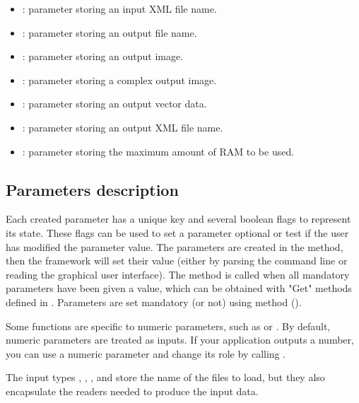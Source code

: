\begin{itemize}
  \item {} : parameter storing an input XML file name.
  \item {} : parameter storing an output file name.
  \item {} : parameter storing an output image.
  \item {} : parameter storing a complex output image.
  \item {} : parameter storing an output vector data.
  \item {} : parameter storing an output XML file name.
  \item {} : parameter storing the maximum amount of RAM to be used.
\end{itemize}

\subsection{Parameters description}

Each created parameter has a unique key and several boolean flags to represent its state. These flags
can be used to set a parameter optional or test if the user has modified the parameter value. The parameters
are created in the  method, then the framework will set their value (either by parsing the 
command line or reading the graphical user interface). The  method is called when all 
mandatory parameters have been given a value, which can be obtained with "Get" methods defined in 
. Parameters are set mandatory (or not) using  method ().

Some functions are specific to numeric parameters, such as 
or . By default, numeric parameters are treated as inputs.
If your application outputs a number, you can use a numeric parameter and change its role by calling 
.

The input types , , , 
and  store the name of the files to load, but they also encapsulate the 
readers needed to produce the input data.


